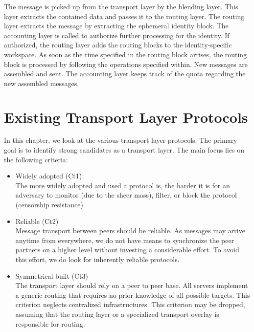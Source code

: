 The message is picked up from the transport layer by the blending layer. This layer extracts the contained data and passes it to the routing layer. The routing layer extracts the message by extracting the ephemeral identity block. The accounting layer is called to authorize further processing for the identity. If authorized, the routing layer adds the routing blocks to the identity-specific workspace. As soon as the time specified in the routing block arrises, the routing block is processed by following the operations specified within. New messages are assembled and sent. The accounting layer keeps track of the quota regarding the new assembled messages. 

\chapter{Existing Transport Layer Protocols \label{sec:existingTPP}}
In this chapter, we look at the various transport layer protocols. The primary goal is to identify strong candidates as a transport layer. The main focus lies on the following criteria:
\begin{itemize}
	\item Widely adopted (Ct1)\\
	The more widely adopted and used a protocol is, the harder it is for an adversary to monitor (due to the sheer mass), filter, or block the protocol (censorship resistance).
	\item Reliable (Ct2)\\
	Message transport between peers should be reliable. As messages may arrive anytime from everywhere, we do not have means to synchronize the peer partners on a higher level without investing a considerable effort. To avoid this effort, we do look for inherently reliable protocols.
	\item Symmetrical built (Ct3)\\
	The transport layer should rely on a peer to peer base. All servers implement a generic routing that requires no prior knowledge of all possible targets. This criterion neglects centralized infrastructures. This criterion may be dropped, assuming that the routing layer or a specialized transport overlay is responsible for routing.
\end{itemize}


